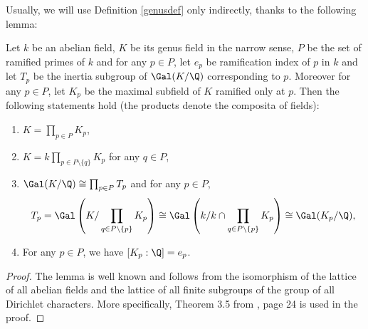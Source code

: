 Usually, we will use Definition \ref{genusdef} only indirectly, thanks to the following lemma:
\begin{lemma}\label{genus}
Let $k$ be an abelian field, $K$ be its genus field in the narrow sense, $P$ be the set of ramified primes of $k$ and for any $p\in P$, let $e_p$ be ramification index of $p$ in $k$ and let $T_p$ be the inertia subgroup of $\Gal(K/\Q)$ corresponding to $p$. Moreover for any $p\in P$, let $K_p$ be the maximal subfield of $K$ ramified only at $p$.
Then the following statements hold (the products denote the composita of fields):
\begin{enumerate}[label={\upshape(\roman*)}]
\item $K=\prod_{p\in P} K_p$,
\item $K=k\prod_{p\in P\setminus \{q\}} K_p$ for any $q\in P$,
\item $\Gal(K/\Q)\cong \prod_{p\in P} T_p$ and for any $p\in P$, $$T_p=\Gal\left(K/\prod_{q\in P\setminus\{p\}}K_p\right)\cong \Gal\left(k/k\cap\prod_{q\in P\setminus\{p\}}K_p\right)\cong \Gal(K_p/\Q),$$
\item For any $p\in P$, we have $[K_p:\Q]=e_p$.
\end{enumerate}
\end{lemma}
\pagebreak
\begin{proof}
The lemma %
is well known and follows from the isomorphism of the lattice of all abelian fields and the lattice of all finite subgroups of the group of all Dirichlet characters. More specifically, Theorem 3.5 from \citep{washington1997}, page 24 %
is used in the proof. %
\end{proof}

